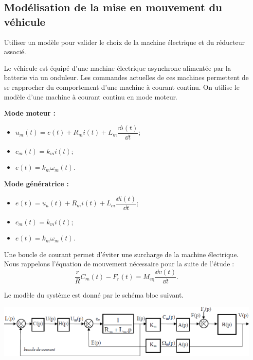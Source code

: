 \documentclass[10pt,fleqn]{article} %
\begin{document}
\begin{multicols}{2}
\subsection*{Modélisation de la mise en mouvement du véhicule}
\begin{obj}
Utiliser un modèle pour valider le choix de la machine électrique et du réducteur associé.
\end{obj}


Le véhicule est équipé d’une machine électrique asynchrone alimentée par la batterie via un onduleur. Les
commandes actuelles de ces machines permettent de se rapprocher du comportement d’une machine à courant
continu.
On utilise le modèle d’une machine à courant continu en mode moteur. 

\textbf{Mode moteur :}
\begin{itemize}
\item $u_m(t)=e(t)+R_m i(t)+L_m \dfrac{\dd i(t)}{\dd t}$;
\item $c_m(t)=k_m i(t)$;
\item $e(t)=k_m\omega_m(t)$.
\end{itemize}
\textbf{Mode génératrice :}
\begin{itemize}
\item $e(t)=u_a(t)+R_m i(t)+L_m \dfrac{\dd i(t)}{\dd t}$;
\item $c_m(t)=k_m i(t)$;
\item $e(t)=k_m\omega_m(t)$.
\end{itemize}

Une boucle de courant permet d’éviter une surcharge de la machine électrique.
Nous rappelons l’équation de mouvement nécessaire pour la suite de l’étude : 
$$\dfrac{r}{R}C_m(t)-F_r(t)=M_{\text{eq}}\dfrac{\dd v(t)}{\dd t}.$$

Le modèle du système est donné par le schéma bloc suivant.

\begin{center}
\includegraphics[width=\linewidth]{images/ccmp_01}
\end{center}





\end{multicols}
\end{document}
